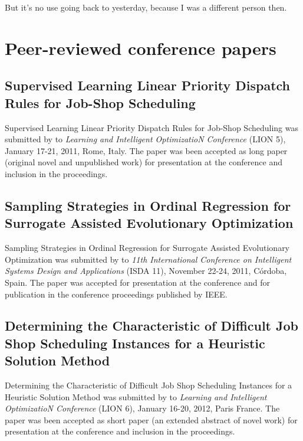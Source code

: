 \begin{savequote}[75mm] 
But it's no use going back to yesterday, because I was a different person then.
\end{savequote}

\chapter{Peer-reviewed conference papers}\label{app:confpapers} 

\section[LION5]{Supervised Learning Linear Priority Dispatch Rules for Job-Shop Scheduling}\label{app:lion5}
Supervised Learning Linear Priority Dispatch Rules for Job-Shop Scheduling was submitted by \citeauthor{InRu11a} to \emph{Learning and Intelligent OptimizatioN Conference} (LION 5), January 17-21, 2011, Rome, Italy. The paper was been accepted as long paper (original novel and unpublished work) for presentation at the conference and inclusion in the proceedings. 



\section[ISDA11]{Sampling Strategies in Ordinal Regression for Surrogate Assisted Evolutionary Optimization}\label{app:isda2011}
Sampling Strategies in Ordinal Regression for Surrogate Assisted Evolutionary Optimization was submitted by \citeauthor{InRu11b} to \emph{11th International Conference on Intelligent Systems Design and Applications} (ISDA 11), November 22-24, 2011, Córdoba, Spain. The paper was accepted for presentation at the conference and for publication in the conference proceedings published by IEEE.


\section[LION6]{Determining the Characteristic of Difficult Job Shop Scheduling Instances for a Heuristic Solution Method}\label{app:lion6}
Determining the Characteristic of Difficult Job Shop Scheduling Instances for a Heuristic Solution Method was submitted by \citeauthor{InRu12} to \emph{Learning and Intelligent OptimizatioN Conference} (LION 6), January 16-20, 2012, Paris France. The paper was been accepted as short paper (an extended abstract of novel work) for presentation at the conference and inclusion in the proceedings. 

